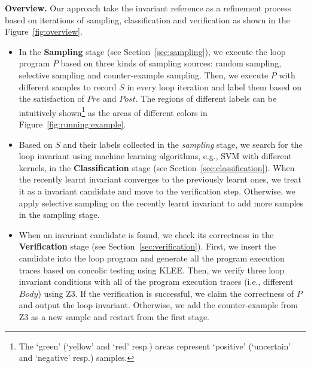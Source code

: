 \medskip\noindent
\textbf{Overview.}
Our approach take the invariant reference as a refinement process 
based on iterations of sampling, classification and verification 
as shown in the Figure~\ref{fig:overview}. 
\begin{itemize}
    \item 
    In the \textbf{Sampling} stage (see Section~\ref{sec:sampling}), 
    we execute the loop program $P$ based on three kinds of sampling sources: 
    random sampling, selective sampling and counter-example sampling. 
    Then, we execute $P$ with different samples to record $S$ in every loop iteration 
    and label them based on the satisfaction of $\mathit{Pre}$ and $\mathit{Post}$. 
    The regions of different labels can be intuitively shown\footnote{
        The `green' (`yellow' and `red' resp.) areas 
        represent `positive' (`uncertain' and `negative' resp.) samples. 
    } as the areas of different colors in Figure~\ref{fig:running:example}. 
    \item 
    Based on $S$ and their labels collected in the \emph{sampling} stage, 
    we search for the loop invariant using machine learning algorithms, 
    e.g., SVM with different kernels, in the \textbf{Classification} stage 
    (see Section~\ref{sec:classification}). 
    When the recently learnt invariant converges to the previously learnt ones, 
    we treat it as a invariant candidate and move to the verification step. 
    Otherwise, we apply selective sampling on the recently learnt invariant 
    to add more samples in the sampling stage. 
    \item 
    When an invariant candidate is found, 
    we check its correctness in the \textbf{Verification} stage (see Section~\ref{sec:verification}). 
    First, we insert the candidate into the loop program and generate all the program execution traces 
    based on concolic testing using KLEE. 
    Then, we verify three loop invariant conditions 
    with all of the program execution traces (i.e., different $\mathit{Body}$) using Z3. 
    If the verification is successful, we claim the correctness of $P$ and output the loop invariant. 
    Otherwise, we add the counter-example from Z3 as a new sample 
    and restart from the first stage. 
\end{itemize}

